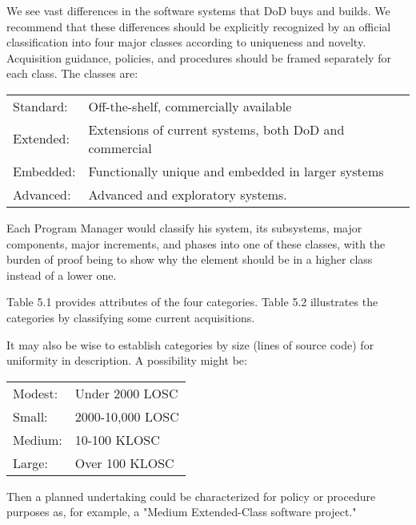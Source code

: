 \documentclass[12pt]{article}
\begin{document}
We see vast differences in the software systems that DoD buys and builds. We
recommend that these differences should be explicitly recognized by an official
classification into four major classes according to uniqueness and novelty.
Acquisition guidance, policies, and procedures should be framed separately for
each class. The classes are:

\begin{center}
    \begin{tabular}{ l l }
Standard: & Off-the-shelf, commercially available \\

Extended: & Extensions of current systems, both DoD and commercial \\

Embedded: & Functionally unique and embedded in larger systems \\

Advanced: & Advanced and exploratory systems. \\
    \end{tabular}
\end{center}

Each Program Manager would classify his system, its subsystems, major
components, major increments, and phases into one of these classes, with the
burden of proof being to show why the element should be in a higher class
instead of a lower one.

Table 5.1 provides attributes of the four categories. Table 5.2 illustrates the
categories by classifying some current acquisitions.

It may also be wise to establish categories by size (lines of source code) for
uniformity in description. A possibility might be:

\begin{center}
    \begin{tabular}{ l l }
Modest: & Under 2000 LOSC\\

Small: & 2000-10,000 LOSC\\

Medium: & 10-100 KLOSC\\

Large: & Over 100 KLOSC\\
    \end{tabular}
\end{center}

Then a planned undertaking could be characterized for policy or procedure purposes
as, for example, a "Medium Extended-Class software project."
\end{document}
